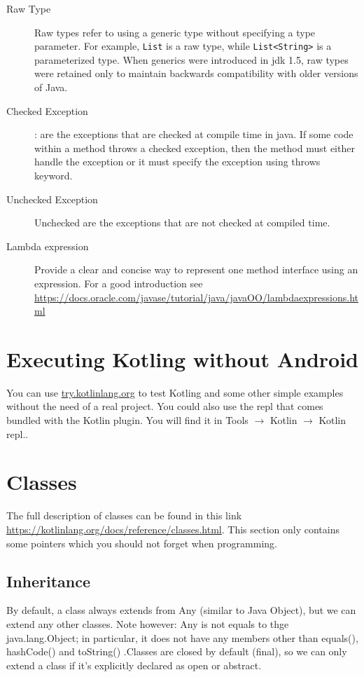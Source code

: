 \begin{description}
	\item[Raw Type] Raw types refer to using a generic type without specifying a type parameter. For example, \texttt{List} is a raw type, while \texttt{List<String>} is a parameterized type. When generics were introduced in \gls{jdk} 1.5, raw types were retained only to maintain backwards compatibility with older versions of Java.
	\item[Checked Exception]: are the exceptions that are checked at compile time in java. If some code within a method throws a checked exception, then the method must either handle the exception or it must specify the exception using throws keyword.
	\item[Unchecked Exception] Unchecked are the exceptions that are not checked at compiled time.
	\item[Lambda expression] Provide a clear and concise way to represent one method interface using an expression. For a good introduction see \url{https://docs.oracle.com/javase/tutorial/java/javaOO/lambdaexpressions.html}
\end{description}

\section{Executing Kotling without Android}

You can use \url{try.kotlinlang.org} to test Kotling and some other simple examples without the need of
a real project. You could also use the \gls{repl} that comes bundled with the Kotlin plugin. You will
find it in Tools $\rightarrow$ Kotlin $\rightarrow$ Kotlin \gls{repl}..

\section{Classes}
The full description of classes can be found in this link \url{https://kotlinlang.org/docs/reference/classes.html}. This section only contains some pointers which you should not forget when programming. 

\subsection{Inheritance}
By default, a class always extends from Any (similar to Java Object), but we can
extend any other classes. Note however: Any is not  equals to thge java.lang.Object; in particular, it does not have any members other than equals(), hashCode() and toString() .Classes are closed by default (final), so we can only extend
a class if it’s explicitly declared as open or abstract.


